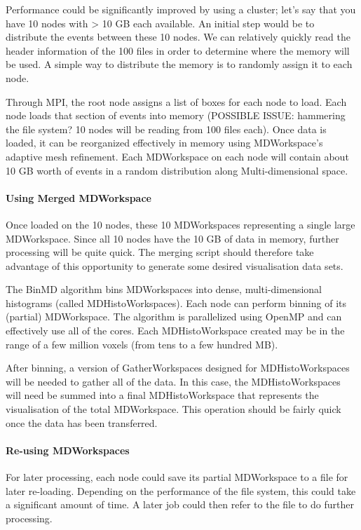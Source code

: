 Performance could be significantly improved by using a cluster; let's say that you have 10 nodes with > 10 GB each available. An initial step would be to distribute the events between these 10 nodes. We can relatively quickly read the header information of the 100 files in order to determine where the memory will be used. A simple way to distribute the memory is to randomly assign it to each node. 

Through MPI, the root node assigns a list of boxes for each node to load. Each node loads that section of events into memory (POSSIBLE ISSUE: hammering the file system? 10 nodes will be reading from 100 files each). Once data is loaded, it can be reorganized effectively in memory using MDWorkspace's adaptive mesh refinement. Each MDWorkspace on each node will contain about 10 GB worth of events in a random distribution along Multi-dimensional space.

\paragraph{Using Merged MDWorkspace}

Once loaded on the 10 nodes, these 10 MDWorkspaces representing a single large MDWorkspace. Since all 10 nodes have the 10 GB of data in memory, further processing will be quite quick. The merging script should therefore take advantage of this opportunity to generate some desired visualisation data sets.

The BinMD algorithm bins MDWorkspaces into dense, multi-dimensional histograms (called MDHistoWorkspaces). Each node can perform binning of its (partial) MDWorkspace. The algorithm is parallelized using OpenMP and can effectively use all of the cores. Each MDHistoWorkspace created may be in the range of a few million voxels (from tens to a few hundred MB).

After binning, a version of GatherWorkspaces designed for MDHistoWorkspaces will be needed to gather all of the data. In this case, the MDHistoWorkspaces will need be summed into a final MDHistoWorkspace that represents the visualisation of the total MDWorkspace. This operation should be fairly quick once the data has been transferred.

\paragraph{Re-using MDWorkspaces}

For later processing, each node could save its partial MDWorkspace to a file for later re-loading. Depending on the performance of the file system, this could take a significant amount of time. A later job could then refer to the file to do further processing.

